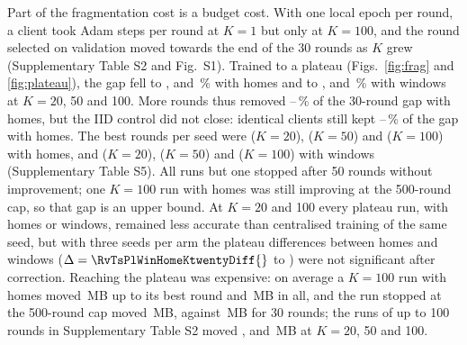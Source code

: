 \begin{table}
\caption{Fragmentation with and without heterogeneity (FedAvg). Homes: homes grouped at random; windows: training
windows dealt at random to equal shards (IID control). Gap: test MAE relative to centralised training after 30 rounds,
and at the plateau (up to 500 rounds, stopped after 50 rounds without improvement). Share: part of the 30-round
gap kept by the control, from unrounded gaps.}\label{tab:frag}

\end{table}

Part of the fragmentation cost is a budget cost. With one local epoch per round, a client took \RvStepsKone{} Adam steps
per round at $K=1$ but only \RvStepsKhundred{} at $K=100$, and the round selected on validation moved towards the end of
the 30 rounds as $K$ grew (Supplementary Table S2 and Fig.~S1). Trained to a plateau (Figs.~\ref{fig:frag} and
\ref{fig:plateau}), the gap
fell to \RvPlhomesKtwentyGap{}, \RvPlhomesKfiftyGap{} and \RvPlhomesKhundredGap{}\,\% with homes and to
\RvPlwindowsKtwentyGap{}, \RvPlwindowsKfiftyGap{} and \RvPlwindowsKhundredGap{}\,\% with windows at $K=20$, 50 and 100.
More rounds thus removed \RvPlRemovedLo{}--\RvPlRemovedHi{}\,\% of the 30-round gap with homes, but the IID control did
not close: identical clients still kept \RvPlShareLo{}--\RvPlShareHi{}\,\% of the gap with homes. The best rounds per seed were \RvPlhomesKtwentyBest{}
($K=20$), \RvPlhomesKfiftyBest{} ($K=50$) and \RvPlhomesKhundredBest{} ($K=100$) with homes, and
\RvPlwindowsKtwentyBest{} ($K=20$), \RvPlwindowsKfiftyBest{} ($K=50$) and \RvPlwindowsKhundredBest{} ($K=100$) with windows (Supplementary Table S5).
All runs but one stopped after 50 rounds without improvement; one $K=100$ run with homes was still improving at the
500-round cap, so that gap is an upper bound. At $K=20$ and 100 every plateau run, with homes or windows, remained less accurate than
centralised training of the same seed, but with three seeds per arm the plateau differences between homes and windows ($\Delta=\RvTsPlWinHomeKtwentyDiff{}$ to
\RvTsPlWinHomeKhundredDiff{}) were not significant after correction. Reaching the plateau was expensive: on average a $K=100$ run
with homes moved \RvPlhomesKhundredMBbest{}\,MB up to its best round and \RvPlhomesKhundredMBtotal{}\,MB in all, and the run stopped at
the 500-round cap moved \RvPlhomesKhundredCapMB{}\,MB, against
\EonethreefedavghouseholdMB{}\,MB for 30 rounds; the runs of up to 100 rounds in Supplementary Table S2 moved \RvLongKtwentyMB{},
\RvLongKfiftyMB{} and \RvLongKhundredMB{}\,MB at $K=20$, 50 and 100.

